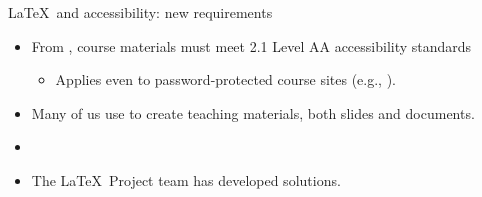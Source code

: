 \begin{frame}{\LaTeX\ and accessibility: new requirements}

\begin{itemize}

\item From , course materials must meet  2.1 Level AA accessibility standards
\begin{itemize}
\item Applies even to password-protected course sites (e.g., ).
\end{itemize}

\bigskip

\item Many of us use \BlueText{\LaTeX} to create teaching materials, both slides and documents.

\bigskip
  
\item \textbf{}
  
\bigskip  
  
\item {} The \LaTeX\ Project team has developed solutions.
\end{itemize}    
  
\end{frame}

